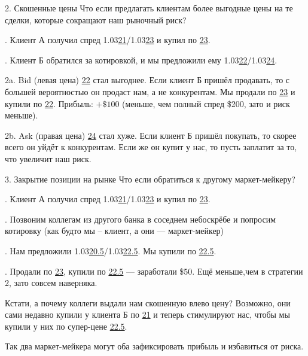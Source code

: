 \documentclass{beamer}
\newcommand{\eurusdBigFigures}{1.03}
\begin{document}
\begin{frame}{2. Скошенные цены}
\justify
Что если предлагать клиентам более выгодные цены на те сделки, которые сокращают
наш рыночный риск?

. Клиент А получил спред \eurusdBigFigures\underline{21}/\eurusdBigFigures\underline{23} и купил по \underline{23}.

. Клиент Б обратился за котировкой, и мы предложили ему \eurusdBigFigures\underline{22}/\eurusdBigFigures\underline{24}.

\justify
2a. Bid (левая цена) \underline{22} стал выгоднее. Если клиент Б пришёл 
продавать, то с большей вероятностью он продаст нам, а не конкурентам.
Мы продали по \underline{23} и купили по \underline{22}. Прибыль: $+\$100$ (меньше, чем полный спред \$200, зато и риск меньше).

\justify
2b. Ask (правая цена) \underline{24} стал хуже. Если клиент Б пришёл покупать,
то скорее всего он уйдёт к конкурентам. Если же он купит у нас, то пусть заплатит за то, что увеличит наш риск.
\end{frame}



\begin{frame}{3. Закрытие позиции на рынке}
\justify
Что если обратиться к другому маркет-мейкеру?

. Клиент А получил спред \eurusdBigFigures\underline{21}/\eurusdBigFigures\underline{23} и купил по \underline{23}.

. Позвоним коллегам из другого банка в соседнем небоскрёбе и попросим 
котировку (как будто мы -- клиент, а они --- маркет-мейкер)

. Нам предложили \eurusdBigFigures\underline{20.5}/\eurusdBigFigures\underline{22.5}. Мы купили по \underline{22.5}.

. Продали по \underline{23}, купили по \underline{22.5} --- заработали \$50. 
Ещё меньше,чем в стратегии 2, зато совсем наверняка.

\justify
Кстати, а почему коллеги выдали нам скошенную влево цену? Возможно, они сами недавно купили у клиента Б по \underline{21} и теперь стимулируют нас, чтобы мы 
купили у них по супер-цене \underline{22.5}.

\justify
Так два маркет-мейкера могут оба зафиксировать прибыль и избавиться от риска.
\end{frame}
\end{document}
